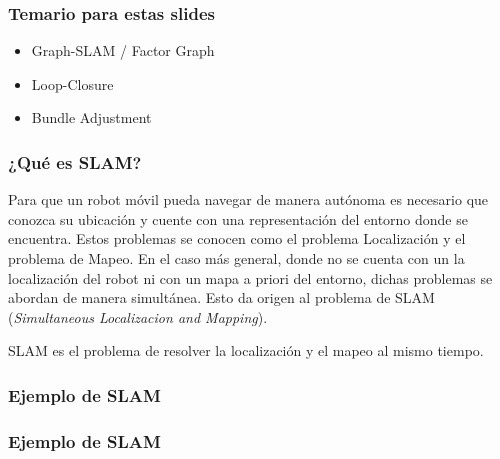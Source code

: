 \begin{frame}
    \frametitle{Temario para estas slides}
    
    \begin{itemize}
        \item Graph-SLAM / Factor Graph
        \item Loop-Closure
        \item Bundle Adjustment
    \end{itemize}
    
\end{frame}

\begin{frame}
    \frametitle{¿Qué es SLAM?}
    
    Para que un robot móvil pueda navegar de manera autónoma es necesario que conozca su ubicación y cuente con una representación del entorno donde se encuentra. Estos problemas se conocen como el problema Localización y el problema de Mapeo. En el caso más general, donde no se cuenta con un la localización del robot ni con un mapa a priori del entorno, dichas problemas se abordan de manera simultánea. Esto da origen al problema de SLAM (\emph{Simultaneous Localizacion and Mapping}).
    \begin{block}{}
        SLAM es el problema de resolver la localización y el mapeo al mismo tiempo.
    \end{block}
    
\end{frame}


\begin{frame}
    \frametitle{Ejemplo de SLAM}
    
    \begin{figure}
        \hfill{}
    \end{figure}
    
\end{frame}

\begin{frame}
    \frametitle{Ejemplo de SLAM}
    
    \begin{figure}
        \hfill{}
    \end{figure}
    
\end{frame}

